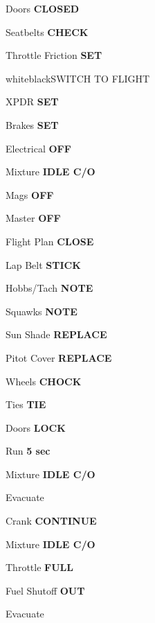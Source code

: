\documentclass{article}
\begin{document}
\begin{multicols*}{3}
Doors \dotfill \textbf{CLOSED}

Seatbelts \dotfill \textbf{CHECK}

Throttle Friction \dotfill \textbf{SET} \\

\begin{groupheading}{white}{black}{SWITCH TO FLIGHT}
\end{groupheading}

\color{black}

\colorbox{green!80!red}{}

XPDR \dotfill \textbf{SET}

Brakes \dotfill \textbf{SET}

Electrical \dotfill \textbf{OFF}

Mixture \dotfill \textbf{IDLE C/O}

Mags \dotfill \textbf{OFF}

Master \dotfill \textbf{OFF}

Flight Plan \dotfill \textbf{CLOSE}

\colorbox{green!80!red}{}

Lap Belt \dotfill \textbf{STICK}

Hobbs/Tach \dotfill \textbf{NOTE}

Squawks \dotfill \textbf{NOTE}

Sun Shade \dotfill \textbf{REPLACE}

Pitot Cover \dotfill \textbf{REPLACE}

Wheels \dotfill \textbf{CHOCK}

Ties \dotfill \textbf{TIE}

Doors \dotfill \textbf{LOCK} \\



\colorbox{red!80}{}

\colorbox{orange!80}{}

Run \dotfill \textbf{5 sec}

Mixture \dotfill \textbf{IDLE C/O}

Evacuate \dotfill

\colorbox{orange!80}{}

Crank \dotfill \textbf{CONTINUE}

Mixture \dotfill \textbf{IDLE C/O}

Throttle \dotfill \textbf{FULL}

Fuel Shutoff \dotfill \textbf{OUT}

Evacuate \dotfill \\

\end{multicols*}
\end{document}
